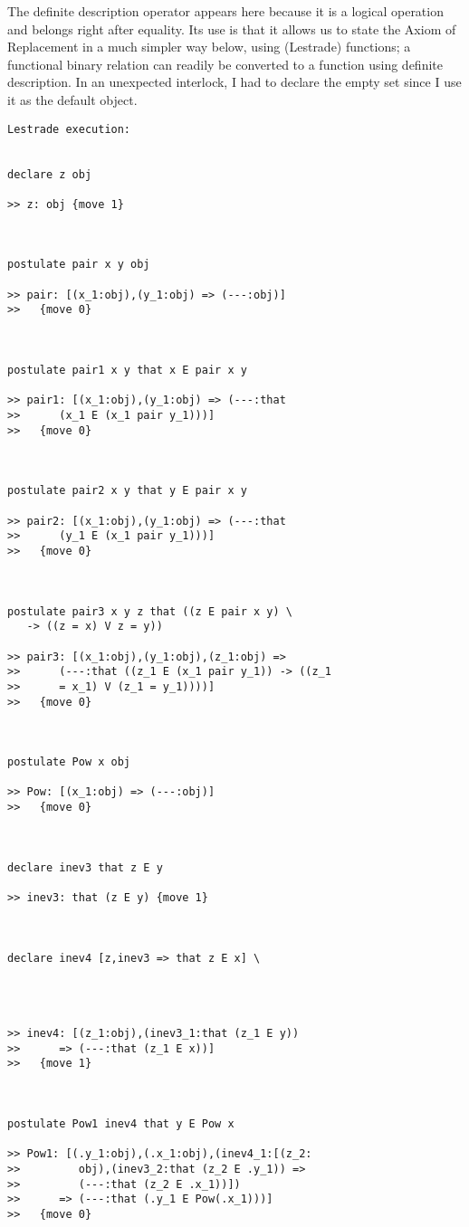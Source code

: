 \documentclass{article}
\begin{document}
The definite description operator appears here because it is a logical operation and belongs right after equality.  Its use is that it allows
us to state the Axiom of Replacement in a much simpler way below, using (Lestrade) functions;  a functional binary relation can readily be converted
to a function using definite description.  In an unexpected interlock, I had to declare the empty set since I use it as the default object.

\begin{verbatim}Lestrade execution:


declare z obj

>> z: obj {move 1}



postulate pair x y obj

>> pair: [(x_1:obj),(y_1:obj) => (---:obj)]
>>   {move 0}



postulate pair1 x y that x E pair x y

>> pair1: [(x_1:obj),(y_1:obj) => (---:that
>>      (x_1 E (x_1 pair y_1)))]
>>   {move 0}



postulate pair2 x y that y E pair x y

>> pair2: [(x_1:obj),(y_1:obj) => (---:that
>>      (y_1 E (x_1 pair y_1)))]
>>   {move 0}



postulate pair3 x y z that ((z E pair x y) \
   -> ((z = x) V z = y))

>> pair3: [(x_1:obj),(y_1:obj),(z_1:obj) =>
>>      (---:that ((z_1 E (x_1 pair y_1)) -> ((z_1
>>      = x_1) V (z_1 = y_1))))]
>>   {move 0}



postulate Pow x obj

>> Pow: [(x_1:obj) => (---:obj)]
>>   {move 0}



declare inev3 that z E y

>> inev3: that (z E y) {move 1}



declare inev4 [z,inev3 => that z E x] \
   



>> inev4: [(z_1:obj),(inev3_1:that (z_1 E y))
>>      => (---:that (z_1 E x))]
>>   {move 1}



postulate Pow1 inev4 that y E Pow x

>> Pow1: [(.y_1:obj),(.x_1:obj),(inev4_1:[(z_2:
>>         obj),(inev3_2:that (z_2 E .y_1)) =>
>>         (---:that (z_2 E .x_1))])
>>      => (---:that (.y_1 E Pow(.x_1)))]
>>   {move 0}




\end{verbatim}
\end{document}
